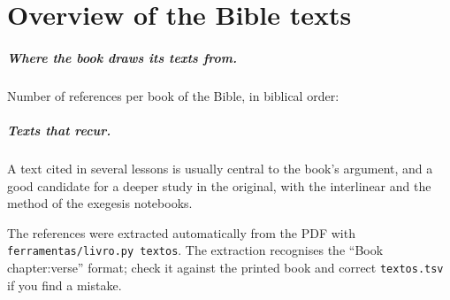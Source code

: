 \chapter{Overview of the Bible texts}

\paragraph{Where the book draws its texts from.} Number of references per book
of the Bible, in biblical order:

\begin{center}\small\begin{minipage}{.94\linewidth}\raggedright
\textosporlivro
\end{minipage}\end{center}

\paragraph{Texts that recur.} A text cited in several lessons is usually
central to the book's argument, and a good candidate for a deeper study in the
original, with the interlinear and the method of the exegesis notebooks.


\begin{nota}
The references were extracted automatically from the PDF with
\texttt{ferramentas/livro.py textos}. The extraction recognises the
\enquote{Book chapter:verse} format; check it against the printed book and
correct \texttt{textos.tsv} if you find a mistake.
\end{nota}
